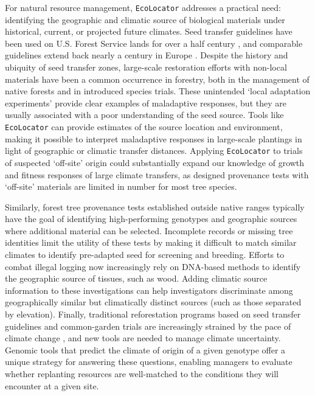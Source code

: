 \documentclass[]{article}
\newcommand{\ecolocator}{\texttt{EcoLocator}\xspace}
\begin{document}
For natural resource management,
\ecolocator addresses a practical need:
identifying the geographic and climatic source of biological materials
under historical, current, or projected future climates.
Seed transfer guidelines have been used on U.S. Forest Service lands
for over a half century \citep{kummel_forest_1944}, and comparable guidelines 
extend back nearly a century in Europe \citep{myking_historic_2016}. 
Despite the history and ubiquity of seed transfer zones, 
large-scale restoration efforts with non-local materials have been a 
common occurrence in forestry, both in the management of native forests
and in introduced species trials.
These unintended `local adaptation experiments' provide clear examples of 
maladaptive responses, but they are usually associated with a poor
understanding of the seed source. Tools like \ecolocator can
provide estimates of the source location and environment,
making it possible to interpret maladaptive responses in large-scale 
plantings in light of geographic or climatic transfer distances. 
Applying \ecolocator to trials of suspected `off-site' origin could
substantially expand our knowledge of growth and
fitness responses of large climate transfers, as designed provenance tests with 
`off-site' materials are limited in number for most tree species.

Similarly,
forest tree provenance tests established outside native ranges
typically have the goal of identifying high-performing genotypes and geographic
sources where additional material can be selected.
Incomplete records or missing tree identities limit the utility of these tests
by making it difficult to match similar climates to identify pre-adapted seed for screening
and breeding.
Efforts to combat illegal logging now increasingly rely
on DNA-based methods to identify the geographic source of tissues,
such as wood.
Adding climatic source information to these investigations
can help investigators discriminate among geographically similar
but climatically distinct sources (such as those separated by elevation).
Finally,
traditional reforestation programs based on seed transfer guidelines
and common-garden trials are increasingly strained
by the pace of climate change \citep{aitken_bemmels_2016},
and new tools are needed to manage climate uncertainty.
Genomic tools that predict the climate of origin of a given genotype
offer a unique strategy for answering these questions,
enabling managers to evaluate whether replanting resources
are well-matched to the conditions they will encounter
at a given site.
\end{document}
